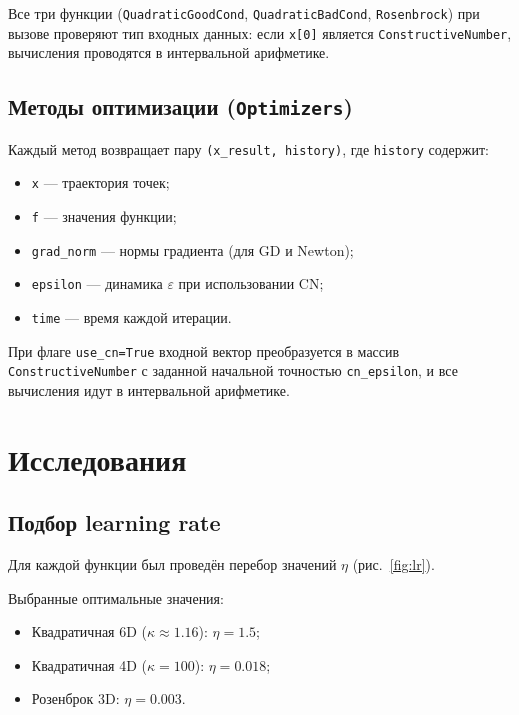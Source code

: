 \documentclass[a4paper, 14pt]{extarticle}
\begin{document}
Все три функции (\texttt{QuadraticGoodCond}, \texttt{QuadraticBadCond}, \texttt{Rosenbrock}) при вызове проверяют тип входных данных: если \texttt{x[0]} является \texttt{ConstructiveNumber}, вычисления проводятся в интервальной арифметике.

\subsection{Методы оптимизации (\texttt{Optimizers})}

Каждый метод возвращает пару \texttt{(x\_result, history)}, где \texttt{history} содержит:
\begin{itemize}
    \item \texttt{x} --- траектория точек;
    \item \texttt{f} --- значения функции;
    \item \texttt{grad\_norm} --- нормы градиента (для GD и Newton);
    \item \texttt{epsilon} --- динамика $\varepsilon$ при использовании CN;
    \item \texttt{time} --- время каждой итерации.
\end{itemize}

При флаге \texttt{use\_cn=True} входной вектор преобразуется в массив \texttt{ConstructiveNumber} с заданной начальной точностью \texttt{cn\_epsilon}, и все вычисления идут в интервальной арифметике.


\section{Исследования}

\subsection{Подбор learning rate}

Для каждой функции был проведён перебор значений $\eta$ (рис.~\ref{fig:lr}).

Выбранные оптимальные значения:
\begin{itemize}
    \item Квадратичная 6D ($\kappa \approx 1.16$): $\eta = 1.5$;
    \item Квадратичная 4D ($\kappa = 100$): $\eta = 0.018$;
    \item Розенброк 3D: $\eta = 0.003$.
\end{itemize}
\end{document}
